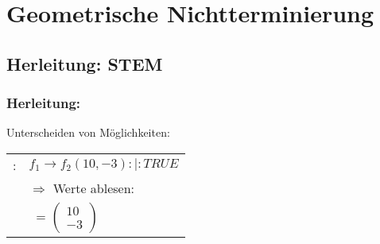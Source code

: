 \section{Geometrische Nichtterminierung}

\frame{\tableofcontents[currentsection]}

\subsection{Herleitung: STEM}


\begin{frame}[fragile]
	\frametitle{Herleitung: \stem}
	Unterscheiden von  M\"oglichkeiten:\newline
	
	\begin{tabular}{rl}
		\blue{konstanter \stem}: & $f_1 \rightarrow f_2(10,-3) :|: TRUE$ \\
							  & $\Rightarrow$ Werte ablesen:  \\
							  & \quad$\>$ \stem = $ \begin{pmatrix} 10 \\ -3 \end{pmatrix}$ \\
								  
	\end{tabular}
	
\end{frame}

